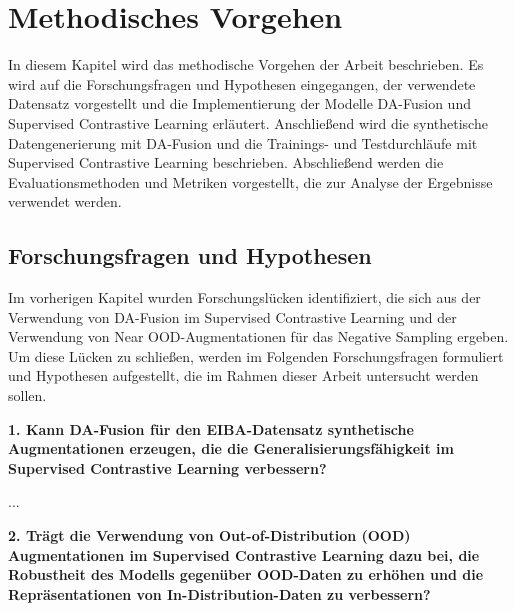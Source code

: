 \chapter{Methodisches Vorgehen}

In diesem Kapitel wird das methodische Vorgehen der Arbeit beschrieben. Es wird auf die Forschungsfragen und Hypothesen eingegangen, der verwendete Datensatz vorgestellt und die Implementierung der Modelle DA-Fusion und Supervised Contrastive Learning erläutert. Anschließend wird die synthetische Datengenerierung mit DA-Fusion und die Trainings- und Testdurchläufe mit Supervised Contrastive Learning beschrieben. Abschließend werden die Evaluationsmethoden und Metriken vorgestellt, die zur Analyse der Ergebnisse verwendet werden.

\section{Forschungsfragen und Hypothesen}

Im vorherigen Kapitel wurden Forschungslücken identifiziert, die sich aus der Verwendung von DA-Fusion im Supervised Contrastive Learning und der Verwendung von Near OOD-Augmentationen für das Negative Sampling ergeben. Um diese Lücken zu schließen, werden im Folgenden Forschungsfragen formuliert und Hypothesen aufgestellt, die im Rahmen dieser Arbeit untersucht werden sollen.

\textbf{1. Kann DA-Fusion für den EIBA-Datensatz synthetische Augmentationen erzeugen, die die Generalisierungsfähigkeit im Supervised Contrastive Learning verbessern?}


...

\textbf{2. Trägt die Verwendung von Out-of-Distribution (OOD) Augmentationen im Supervised Contrastive Learning dazu bei, die Robustheit des Modells gegenüber OOD-Daten zu erhöhen und die Repräsentationen von In-Distribution-Daten zu verbessern?}


